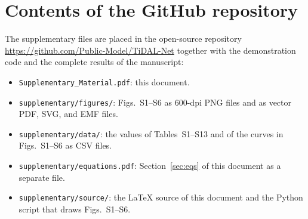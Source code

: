 \documentclass[10pt,a4paper]{article}
\begin{document}
\clearpage
\section{Contents of the GitHub repository}
\label{sec:repo}

The supplementary files are placed in the open-source repository \url{https://github.com/Public-Model/TiDAL-Net} together with the demonstration code and the complete results of the manuscript:
\begin{itemize}
\item \texttt{Supplementary\_Material.pdf}: this document.
\item \texttt{supplementary/figures/}: Figs.~S1--S6 as 600-dpi PNG files and as vector PDF, SVG, and EMF files.
\item \texttt{supplementary/data/}: the values of Tables~S1--S13 and of the curves in Figs.~S1--S6 as CSV files.
\item \texttt{supplementary/equations.pdf}: Section~\ref{sec:eqs} of this document as a separate file.
\item \texttt{supplementary/source/}: the \LaTeX{} source of this document and the Python script that draws Figs.~S1--S6.
\end{itemize}
\end{document}
